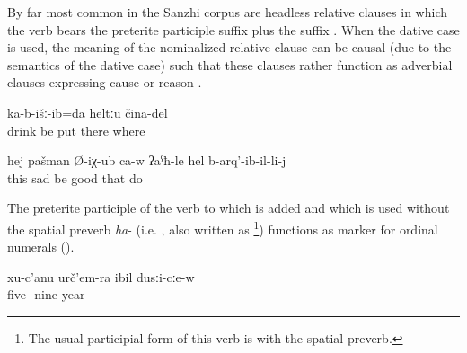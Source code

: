 By far most common in the Sanzhi corpus are headless relative clauses in which the verb bears the preterite participle suffix plus the suffix  . When the dative case is used, the meaning of the nominalized relative clause can be causal (due to the semantics of the dative case) such that these clauses rather function as adverbial clauses expressing cause or reason .
%
\begin{exe}
	\ex	\label{ex:‎the one where they are sitting and drinking, I put this (picture) somewhere}
	\gll	[b-učː-ul	ka-b-iž-ib-il]	ka-b-išː-ib=da	heltːu	čina-del\\
		drink	be	put	there	where\\
	\glt	{}
\end{exe}
%
\begin{exe}	
	\ex	\label{ex:He became sad, in my opinion, he got very sad, because of what he did minor}
	\gll	hej	pašman	Ø-iχ-ub	ca-w	ʡaˁħ-le	hel	b-arq'-ib-il-li-j	\\
		this	sad	be		good	that	do\\
	\glt	{}

\end{exe}

The preterite participle of the verb  to which  is added and which is used without the spatial preverb \textit{ha}- (i.e. , also written as \footnote{The usual participial form of this verb is  with the spatial preverb.}) functions as marker for ordinal numerals  ().
%
\begin{exe}
	\ex	\label{ex:in the year (19)59}
	\gll	xu-c'anu	urč'em-ra	ibil	dusːi-cːe-w\\
		five-	nine		year\\
	\glt	{}
\end{exe}

